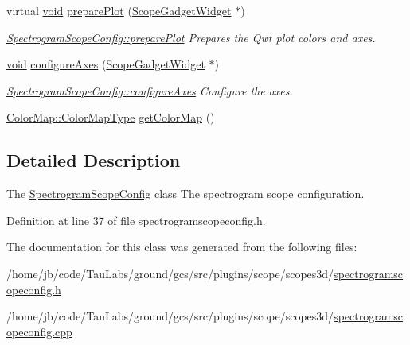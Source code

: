 \begin{DoxyCompactItemize}
virtual \hyperlink{group___u_a_v_objects_plugin_ga444cf2ff3f0ecbe028adce838d373f5c}{void} \hyperlink{group___scope_plugin_ga56b200887661925df25743af2f62375b}{prepare\-Plot} (\hyperlink{class_scope_gadget_widget}{\-Scope\-Gadget\-Widget} $\ast$)
\begin{DoxyCompactList}\small\item\em \hyperlink{group___scope_plugin_ga56b200887661925df25743af2f62375b}{\-Spectrogram\-Scope\-Config\-::prepare\-Plot} \-Prepares the \-Qwt plot colors and axes. \end{DoxyCompactList}\item 
\hyperlink{group___u_a_v_objects_plugin_ga444cf2ff3f0ecbe028adce838d373f5c}{void} \hyperlink{group___scope_plugin_ga607c43753c7a8540b7953d4945f2f6b5}{configure\-Axes} (\hyperlink{class_scope_gadget_widget}{\-Scope\-Gadget\-Widget} $\ast$)
\begin{DoxyCompactList}\small\item\em \hyperlink{group___scope_plugin_ga607c43753c7a8540b7953d4945f2f6b5}{\-Spectrogram\-Scope\-Config\-::configure\-Axes} \-Configure the axes. \end{DoxyCompactList}\item 
\hyperlink{group___scope_plugin_ga7f4f087196557757ec8061242e795031}{\-Color\-Map\-::\-Color\-Map\-Type} \hyperlink{group___scope_plugin_ga429eb179a2c1b1f46a1d45a699e983f2}{get\-Color\-Map} ()
\end{DoxyCompactItemize}


\subsection{\-Detailed \-Description}
\-The \hyperlink{class_spectrogram_scope_config}{\-Spectrogram\-Scope\-Config} class \-The spectrogram scope configuration. 

\-Definition at line 37 of file spectrogramscopeconfig.\-h.



\-The documentation for this class was generated from the following files\-:\begin{DoxyCompactItemize}
\item 
/home/jb/code/\-Tau\-Labs/ground/gcs/src/plugins/scope/scopes3d/\hyperlink{spectrogramscopeconfig_8h}{spectrogramscopeconfig.\-h}\item 
/home/jb/code/\-Tau\-Labs/ground/gcs/src/plugins/scope/scopes3d/\hyperlink{spectrogramscopeconfig_8cpp}{spectrogramscopeconfig.\-cpp}\end{DoxyCompactItemize}
